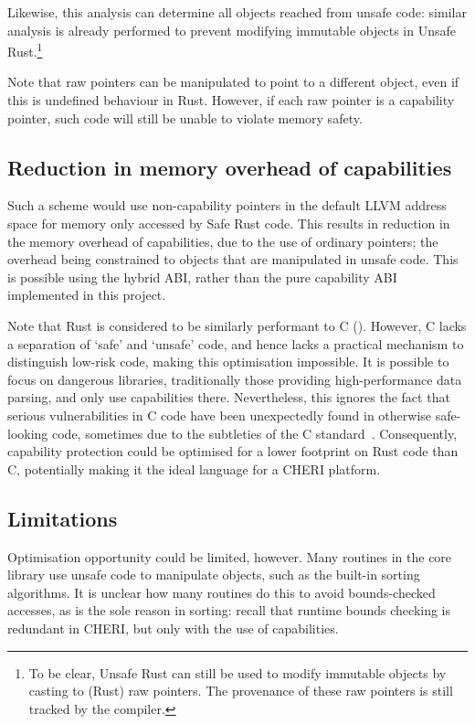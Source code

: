 \documentclass[dissertation.tex]{subfiles}
\begin{document}
Likewise, this analysis can determine all objects reached from unsafe
code: similar analysis is already performed to prevent modifying
immutable objects in Unsafe Rust.\footnote{
To be clear, Unsafe Rust can still be used to modify immutable objects
by casting to (Rust) raw pointers.
The provenance of these raw pointers is still tracked by the compiler.
}

Note that raw pointers can be manipulated to point to a different
object, even if this is undefined behaviour in Rust.
However, if each raw pointer is a capability pointer, such code will
still be unable to violate memory safety.


\subsection{Reduction in memory overhead of capabilities}
Such a scheme would use non-capability pointers in the default LLVM
address space for memory only accessed by Safe Rust code.
This results in reduction in the memory overhead of capabilities, due to
the use of ordinary pointers; the overhead being constrained to objects
that are manipulated in unsafe code.
This is possible using the hybrid ABI, rather than the pure capability
ABI implemented in this project.

Note that Rust is considered to be similarly performant to C
().
However, C lacks a separation of `safe' and `unsafe' code, and hence
lacks a practical mechanism to distinguish low-risk code, making this
optimisation impossible.
It is possible to focus on dangerous libraries, traditionally those
providing high-performance data parsing, and only use capabilities
there.
Nevertheless, this ignores the fact that serious vulnerabilities in C code
have been unexpectedly found in otherwise safe-looking code, sometimes
due to the subtleties of the C standard~\cite{memarian2016cdepths}.
Consequently, capability protection could be optimised for a lower
footprint on Rust code than C, potentially making it the ideal language
for a CHERI platform.


\subsection{Limitations}
Optimisation opportunity could be limited, however.
Many routines in the core library use unsafe code to manipulate objects,
such as the built-in sorting algorithms.
It is unclear how many routines do this to avoid bounds-checked
accesses, as is the sole reason in sorting: recall that runtime bounds
checking is redundant in CHERI, but only with the use of capabilities.
\end{document}
